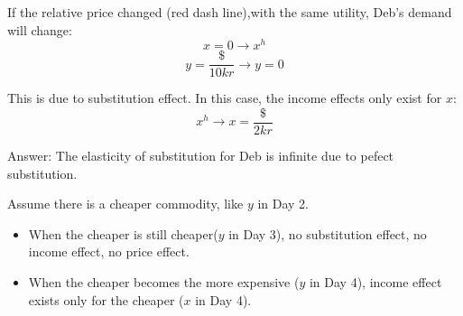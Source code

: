 \documentclass{article}
\begin{document}
\begin{mdframed}[backgroundcolor=blue!20,linecolor=white]
\begin{center}
\label{fig:fair}
\end{center}

\vspace{2mm}


If the relative price changed (red dash line),with the same utility, Deb's demand will change:
$$x=0 \to x^h$$
$$y=\frac{\$}{10 kr} \to y= 0$$

This is due to substitution effect. In this case, the income effects only exist for $x$:
$$x^h \to x= \frac{\$}{2kr}$$

\end{mdframed}

Answer: The elasticity of substitution for Deb is infinite due to pefect substitution.

Assume there is a cheaper commodity, like $y$ in Day 2.
\begin{itemize}
\item When the cheaper is still cheaper($y$ in Day 3), no substitution effect, no income effect, no price effect.
\item When the cheaper becomes the more expensive ($y$ in Day 4),  income effect exists only for the cheaper ($x$ in Day 4).
\end{itemize}
\end{document}
